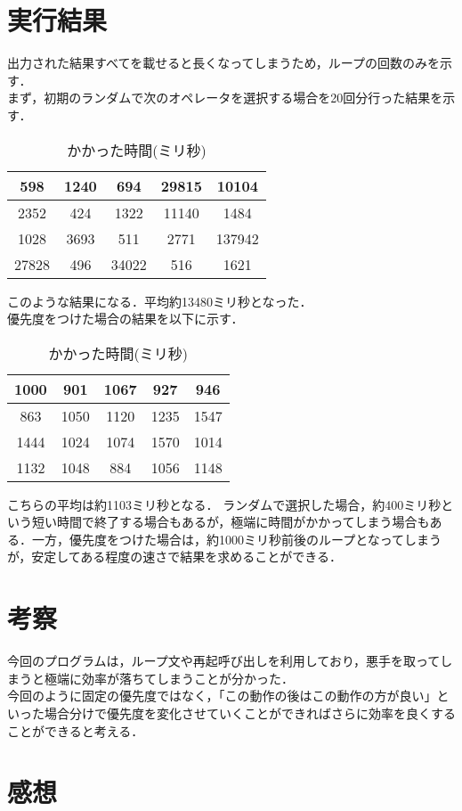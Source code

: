 \documentclass[a4j]{jarticle}
\begin{document}
\section{実行結果}
出力された結果すべてを載せると長くなってしまうため，ループの回数のみを示す．\\
まず，初期のランダムで次のオペレータを選択する場合を20回分行った結果を示す．\\
\begin{table}[H]
\begin{center}
\begin{tabular}{|c|c|c|c|c|}
\hline
598  & 1240  & 694    & 29815 & 10104   \\ \hline
2352   & 424  & 1322    & 11140  & 1484   \\ \hline
1028   & 3693  & 511  & 2771 & 137942  \\ \hline
27828   & 496 & 34022   & 516  & 1621 \\ \hline
\end{tabular}
\end{center}
\caption{かかった時間(ミリ秒)}
\end{table}
このような結果になる．平均約13480ミリ秒となった．\\
優先度をつけた場合の結果を以下に示す．
\begin{table}[H]
\begin{center}
\begin{tabular}{|c|c|c|c|c|}
\hline
1000  & 901  & 1067 & 927 & 946   \\ \hline
863  & 1050  & 1120 & 1235 & 1547 \\ \hline
1444   & 1024 & 1074 & 1570 & 1014  \\ \hline
1132   & 1048 & 884  & 1056  & 1148 \\ \hline
\end{tabular}
\end{center}
\caption{かかった時間(ミリ秒)}
\end{table}
こちらの平均は約1103ミリ秒となる．
ランダムで選択した場合，約400ミリ秒という短い時間で終了する場合もあるが，極端に時間がかかってしまう場合もある．一方，優先度をつけた場合は，約1000ミリ秒前後のループとなってしまうが，安定してある程度の速さで結果を求めることができる．
\section{考察}
今回のプログラムは，ループ文や再起呼び出しを利用しており，悪手を取ってしまうと極端に効率が落ちてしまうことが分かった．\\
今回のように固定の優先度ではなく，「この動作の後はこの動作の方が良い」といった場合分けで優先度を変化させていくことができればさらに効率を良くすることができると考える．

\section{感想}
\end{document}

